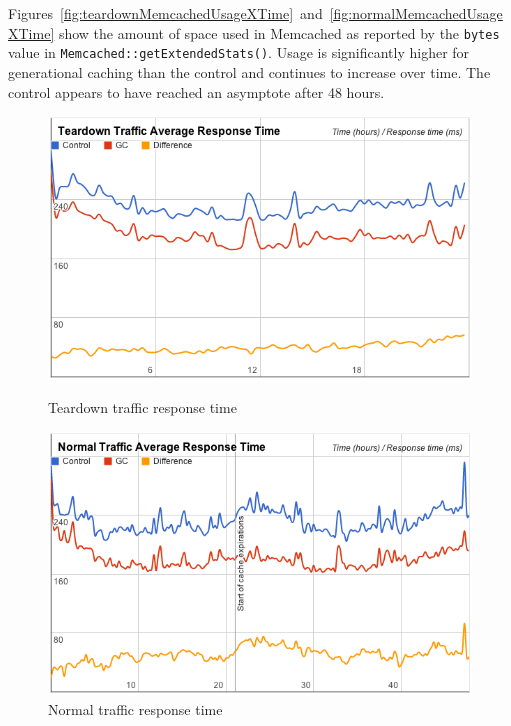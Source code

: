 \documentclass[12pt]{ucthesis}
\begin{document}
Figures~\ref{fig:teardownMemcachedUsageXTime}~and~\ref{fig:normalMemcachedUsageXTime} show the amount of space used in \textsf{Memcached} as reported by the {\tt bytes} value in {\tt Memcached::getExtendedStats()}\cite{memcachedStatsDocs}.
Usage is significantly higher for generational caching than the control and continues to increase over time.
The control appears to have reached an asymptote after 48 hours.

\begin{figure}[htp]
\centering
\includegraphics[width=\textwidth]{assets/teardownRespTimeXTime.png}
\caption{Teardown traffic response time}
\label{fig:teardownRespTimeXTime}

\vspace{2em}
\centering
\includegraphics[width=\textwidth]{assets/normalRespTimeXTime.png}
\caption{Normal traffic response time}
\label{fig:normalRespTimeXTime}
\end{figure}
\end{document}
